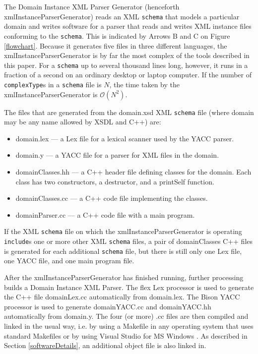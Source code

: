 \documentclass[preprint,12pt]{elsarticle}
\begin{document}
The Domain Instance XML Parser Generator (henceforth
xmlInstanceParserGenerator) reads an XML {\tt schema} that models a particular
domain and writes software for a parser that reads and writes XML instance
files conforming to the {\tt schema}. This is indicated by Arrows B and C
on Figure \ref{flowchart}. Because it generates five files in three
different languages, the xmlInstanceParserGenerator is by far the most
complex of the tools described in this paper. For a {\tt schema} up to
several thousand lines long, however, it runs in a fraction of a second on
an ordinary desktop or laptop computer. If the number of {\tt complexType}s
in a {\tt schema} file is ${N}$, the time taken by the
xmlInstanceParserGenerator is $\mathcal{O}{(N^2)}$.

The files that are generated from the domain.xsd XML {\tt schema} file
(where domain may be any name allowed by XSDL and C++) are:
\begin{itemize}
\item[] domain.lex –-- a Lex file for a lexical scanner used by the YACC
  parser.
\item[] domain.y --- a YACC file for a parser for XML files in the domain. 
\item[] domainClasses.hh --- a C++ header file defining classes for
      the domain. Each class has two constructors, a destructor, 
      and a printSelf function.
\item[] domainClasses.cc --– a C++ code file implementing the classes.
\item[] domainParser.cc --– a C++ code file with a main program.
\end{itemize}

If the XML {\tt schema} file on which the xmlInstanceParserGenerator is
operating {\tt include}s one or more other XML {\tt schema} files, a pair
of domainClasses C++ files is generated for each additional {\tt schema}
file, but there is still only one Lex file, one YACC file, and one main
program file.

After the xmlInstanceParserGenerator has finished running, further
processing builds a Domain Instance XML Parser. The flex Lex processor
\cite{lexAndYacc,flex} is used to generate the C++ file domainLex.cc
automatically from domain.lex. The Bison YACC processor
\cite{lexAndYacc,yacc} is used to generate domainYACC.cc and domainYACC.hh
automatically from domain.y. The four (or more) .cc files are then compiled
and linked in the usual way, i.e. by using a Makefile in any operating
system that uses standard Makefiles or by using Visual Studio for MS
Windows \cite{msC++}. As described in Section \ref{softwareDetails}, an
additional object file is also linked in.
\end{document}
